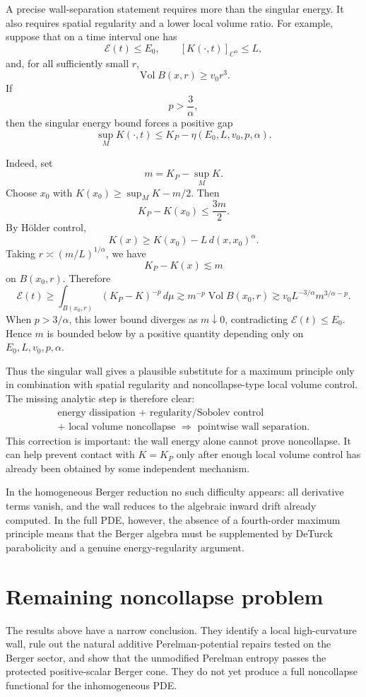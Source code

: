 \documentclass[11pt]{amsart}
\newcommand{\KP}{K_{\!P}}
\newcommand{\Vol}{\operatorname{Vol}}
\begin{document}
A precise wall-separation statement requires more than the singular
energy.  It also requires spatial regularity and a lower local volume ratio.
For example, suppose that on a time interval one has
\[
\mathcal E(t)\le E_0,
\qquad
[K(\cdot,t)]_{C^\alpha}\le L,
\]
and, for all sufficiently small \(r\),
\[
\Vol B(x,r)\ge v_0 r^3 .
\]
If
\[
p>\frac3\alpha,
\]
then the singular energy bound forces a positive gap
\[
\sup_MK(\cdot,t)\le \KP-\eta(E_0,L,v_0,p,\alpha).
\]

Indeed, set
\[
m=\KP-\sup_MK .
\]
Choose \(x_0\) with \(K(x_0)\ge \sup_MK-m/2\).  Then
\[
\KP-K(x_0)\le \frac{3m}{2}.
\]
By Hölder control,
\[
K(x)\ge K(x_0)-L\,d(x,x_0)^\alpha .
\]
Taking \(r\asymp (m/L)^{1/\alpha}\), we have
\[
\KP-K(x)\lesssim m
\]
on \(B(x_0,r)\).  Therefore
\[
\mathcal E(t)
\ge
\int_{B(x_0,r)}(\KP-K)^{-p}\,d\mu
\gtrsim
m^{-p}\Vol B(x_0,r)
\gtrsim
v_0 L^{-3/\alpha}m^{3/\alpha-p}.
\]
When \(p>3/\alpha\), this lower bound diverges as \(m\downarrow0\), contradicting
\(\mathcal E(t)\le E_0\).  Hence \(m\) is bounded below by a positive quantity
depending only on \(E_0,L,v_0,p,\alpha\).

Thus the singular wall gives a plausible substitute for a maximum principle
only in combination with spatial regularity and noncollapse-type local volume
control.  The missing analytic step is therefore clear:
\[
\boxed{
\begin{gathered}
\text{energy dissipation }+\text{ regularity/Sobolev control}\\
+\text{ local volume noncollapse }
\Longrightarrow
\text{ pointwise wall separation}.
\end{gathered}
}
\]
This correction is important: the wall energy alone cannot prove noncollapse.
It can help prevent contact with \(K=\KP\) only after enough local volume
control has already been obtained by some independent mechanism.

In the homogeneous Berger reduction no such difficulty appears: all derivative
terms vanish, and the wall reduces to the algebraic inward drift already
computed.  In the full PDE, however, the absence of a fourth-order maximum
principle means that the Berger algebra must be supplemented by DeTurck
parabolicity and a genuine energy-regularity argument.


\section{Remaining noncollapse problem}

The results above have a narrow conclusion.  They identify a local
high-curvature wall, rule out the natural additive Perelman-potential repairs
tested on the Berger sector, and show that the unmodified Perelman entropy
passes the protected positive-scalar Berger cone.  They do not yet produce a
full noncollapse functional for the inhomogeneous PDE.
\end{document}
